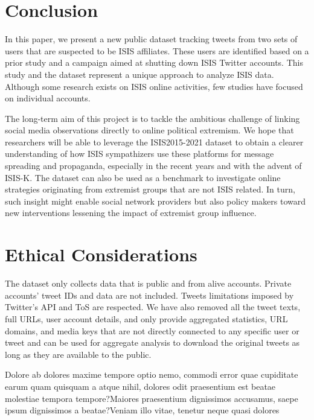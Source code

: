 \documentclass[letterpaper]{article} %
\begin{document}

\section{Conclusion}


 In this paper, we present a new public dataset tracking
  tweets from two sets of users that are suspected to be ISIS affiliates. These users are identified based on a prior study and a campaign aimed at shutting down ISIS Twitter accounts.
 This study and the dataset represent a unique approach to analyze ISIS data. Although some research exists on ISIS online activities, few studies have focused on individual accounts.

The long-term aim of this project is to tackle the ambitious challenge of linking social media observations directly
to online political extremism. We hope that researchers will be able to
leverage the ISIS2015-2021 dataset to obtain a clearer understanding  of
how ISIS sympathizers use these platforms for message spreading and propaganda, especially in the recent years and with the advent of ISIS-K.  The dataset can also be used as a benchmark to investigate online strategies   originating from   extremist groups that are  not ISIS related.
 In turn, such insight might enable  social network providers but also policy makers toward new interventions lessening the impact of extremist group influence.

\section{Ethical Considerations}
The dataset only collects data that is public and from alive accounts. Private accounts' tweet IDs and data are not included. Tweets limitations imposed by Twitter's API and ToS are respected. We have also removed all the tweet texts, full URLs, user account details, and only provide aggregated statistics, URL domains, and media keys that are not directly connected to any specific user or tweet and can be used for aggregate analysis to download the original tweets as long as they are available to the public.



% 
Dolore ab dolores maxime tempore optio nemo, commodi error quae cupiditate earum quam quisquam a atque nihil, dolores odit praesentium est beatae molestiae tempora tempore?Maiores praesentium dignissimos accusamus, saepe ipsum dignissimos a beatae?Veniam illo vitae, tenetur neque quasi dolores

\end{document}
